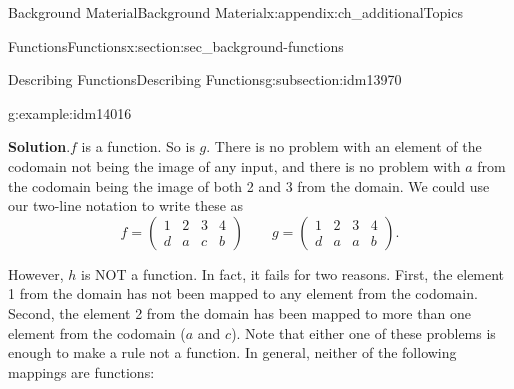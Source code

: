 \documentclass[oneside,10pt,]{book}
\numberwithin{equation}{chapter}
\newcommand{\amp}{&}
\begin{document}
\begin{appendixptx}{Background Material}{}{Background Material}{}{}{x:appendix:ch_additionalTopics}
\begin{sectionptx}{Functions}{}{Functions}{}{}{x:section:sec_background-functions}
\begin{subsectionptx}{Describing Functions}{}{Describing Functions}{}{}{g:subsection:idm13970}
\begin{example}{}{g:example:idm14016}
\begin{sidebyside}{3}{0.0416666666666667}{0.0416666666666667}{0.0833333333333333}
\begin{sbspanel}{0.25}
{}%
\end{sbspanel}%
\end{sidebyside}%
\par\smallskip%
\noindent\textbf{Solution}.\hypertarget{g:solution:idm14028}{}\quad{}\(f\) is a function. So is \(g\). There is no problem with an element of the codomain not being the image of any input, and there is no problem with \(a\) from the codomain being the image of both 2 and 3 from the domain. We could use our two-line notation to write these as%
\begin{equation*}
f= \begin{pmatrix} 1 \amp 2 \amp 3 \amp 4 \\ d \amp a \amp c \amp b \end{pmatrix} \qquad g = \begin{pmatrix} 1 \amp 2 \amp 3 \amp 4 \\ d \amp a \amp a \amp b \end{pmatrix}.
\end{equation*}
%
\par
However, \(h\) is NOT a function. In fact, it fails for two reasons. First, the element 1 from the domain has not been mapped to any element from the codomain. Second, the element 2 from the domain has been mapped to more than one element from the codomain (\(a\) and \(c\)). Note that either one of these problems is enough to make a rule not a function. In general, neither of the following mappings are functions:%
\begin{sidebyside}{2}{0.1375}{0.1375}{0.275}%
\begin{sbspanel}{0.18}%
%
\end{sbspanel}%
\begin{sbspanel}{0.27}%
\end{sbspanel}
\end{sidebyside}
\end{example}
\end{subsectionptx}
\end{sectionptx}
\end{appendixptx}
\end{document}
